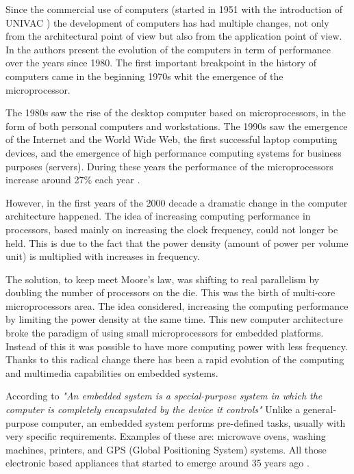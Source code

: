 Since the commercial use of computers (started in 1951 with the introduction of
UNIVAC \cite{Nur}) the development of computers has had multiple changes, not
only from the architectural point of view but also from the application point
of view. In \cite{Hennessy} the authors present the evolution of the computers
in term of performance over the years since 1980. The first important
breakpoint in the history of computers came in the beginning 1970s whit the
emergence of the microprocessor. 

The 1980s saw the rise of the desktop computer based on microprocessors, in the
form of both personal computers and workstations. The 1990s saw the emergence
of the Internet and the World Wide Web, the first successful laptop computing
devices, and the emergence of high performance computing systems for business
purposes (servers). During these years the performance of the microprocessors
increase around 27\% each year \cite{Hennessy}.

However, in the first years of the 2000 decade a dramatic change in the
computer architecture happened. The idea of increasing computing performance in
processors, based mainly on increasing the clock frequency, could not longer be
held. This is due to the fact that the power density (amount of power per
volume unit) is multiplied with increases in frequency. 

The solution, to keep meet Moore's \cite{Mack} law, was shifting to real parallelism by
doubling the number of processors on the die. This was the birth of multi-core
microprocessors area. The idea considered, increasing the computing performance
by limiting the power density at the same time. This new computer architecture
broke the paradigm of using small microprocessors for embedded platforms.
Instead of this it was possible to have more computing power with less
frequency. Thanks to this radical change there has been a rapid evolution of
the computing and multimedia capabilities on embedded systems. 


According to \cite{Hallinan}  \textit{"An embedded system is a special-purpose
system in which the computer is completely encapsulated by the device it
controls"} Unlike a general-purpose computer, an embedded system performs
pre-defined tasks, usually with very specific requirements. Examples of these
are: microwave ovens, washing machines, printers, and GPS (Global Positioning
System) systems. All those electronic based appliances that started to emerge
around 35 years ago \cite{Nur}. 

